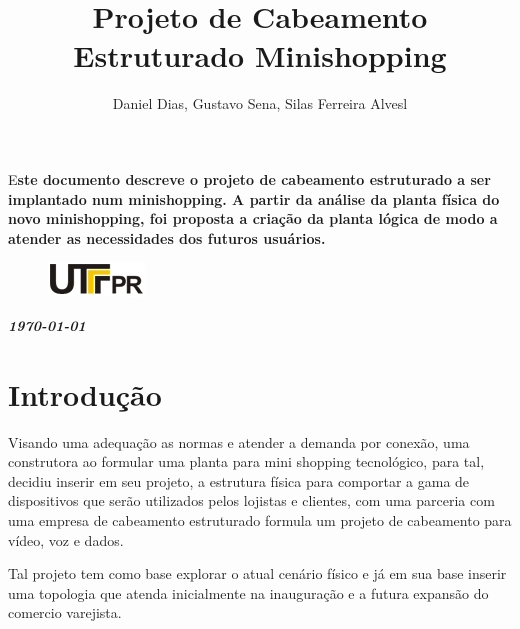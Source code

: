 \documentclass[	DIV=calc,%
							paper=a4,%
							fontsize=12pt,%
							onecolumn]{scrartcl}	 					%
\title{Projeto de Cabeamento Estruturado Minishopping}					%
\author{Daniel Dias, Gustavo Sena, Silas Ferreira Alvesl }  	%
\date{}																				%
\newcommand{\initial}[1]{%
     \lettrine[lines=3,lhang=0.3,nindent=0em]{
     				\color{DarkGoldenrod}
     				{\textsf{#1}}}{}}
\begin{document}
\maketitle
\thispagestyle{fancy} 	
\thispagestyle{empty}		%




\initial{E}\textbf{ste documento descreve o projeto de cabeamento estruturado a ser implantado num minishopping. 
A partir da análise da planta física do novo minishopping, foi proposta  a criação da planta lógica de modo a atender as necessidades dos futuros usuários.}
\begin{figure}
	\centering
	\includegraphics{utfpr}
\end{figure}

\vspace{3cm}
\centerline{\textit{\textbf{\today}}}

\clearpage
    \renewcommand*\listfigurename{Lista de figuras}
\listoffigures

\renewcommand*\listtablename{Lista de tabelas}
\listoftables




\clearpage
\renewcommand{\contentsname}{Sumário}
\tableofcontents
\clearpage

\section{Introdução}
Visando uma adequação as normas e atender a demanda por conexão, uma construtora ao formular uma planta para  mini shopping tecnológico, para tal, decidiu inserir em seu projeto, a estrutura física para comportar a gama de dispositivos que serão utilizados pelos lojistas e clientes, com uma parceria com uma empresa de cabeamento estruturado formula um projeto de cabeamento para vídeo, voz e dados.

Tal projeto tem como base explorar o atual cenário físico e já em sua base inserir uma topologia que atenda inicialmente na inauguração e a futura expansão do comercio varejista.
\end{document}
